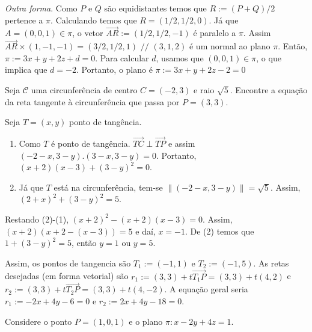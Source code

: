\documentclass[11pt]{exam}
\begin{document}
\begin{questions}
\begin{solution}
   \end{solution}
   \begin{solution}
   {\it Outra forma}. Como $P$ e $Q$ são equidistantes temos que $R:=(P+Q)/2$
   pertence a $\pi$. Calculando temos que  $R=(1/2,1/2,0)$. Já que 
   $A=(0,0,1) \in \pi$, o vetor $\overrightarrow{AR}:=(1/2,1/2,-1)$
   é paralelo a $\pi$. 
   Assim $\overrightarrow{AR}\times (1,-1,-1)=(3/2,1/2,1)$ $//$ $(3,1,2)$
   é um normal ao plano $\pi$. 
   Então, $\pi:=3x+y+2z+d=0$. Para calcular $d$, usamos 
   que $(0,0,1) \in \pi$,  o que implica que $d=-2$. Portanto, o plano 
   é $\pi:=3x+y+2z-2=0$
   \end{solution}
 \question[20] Seja $\mathcal{C}$ uma circunferência de centro 
 $C=(-2,3)$ e raio $\sqrt{5}$. Encontre a equação da reta tangente à circunferência que passa por $P=(3,3)$. 
   \begin{solution}
   Seja $T=(x,y)$ ponto de tangência. 
    \begin{enumerate}
    \item Como $T$ é ponto de tangência. 
    $\overrightarrow{TC} \perp \overrightarrow{TP}$ e
    assim $(-2-x, 3-y).(3-x,3-y)=0$. Portanto, $(x+2)(x-3)+(3-y)^{2}=0$. 
    \item Já que $T$ está na circunferência, tem-se $\|(-2-x, 3-y)\|=\sqrt{5}$. Assim, $(2+x)^{2}+(3-y)^{2}=5$.
    \end{enumerate}
   Restando (2)-(1), $(x+2)^{2}-(x+2)(x-3)=0$. Assim, $(x+2)(x+2-(x-3))=5$
   e daí, $x=-1$. De (2) temos que $1+(3-y)^{2}=5$, então $y=1$ ou $y=5$.
    
   Assim, os pontos de tangencia são $T_1:=(-1,1)$ e $T_{2}:=(-1,5)$.
   As retas desejadas (em forma vetorial) são 
   $r_1:=(3,3)+t\overrightarrow{T_{1}P}=(3,3)+t(4,2)$
   e     $r_2:=(3,3)+t\overrightarrow{T_2P}=(3,3)+t(4,-2)$. A equação geral seria 
   $r_{1}:=-2x+4y-6=0$ e  
   $r_{2}:=2x+4y-18=0$. 
   \end{solution}
 \question Considere o ponto $P=(1,0,1)$ e o plano $\pi: x-2y+4z=1$.
\end{questions}
\end{document}
